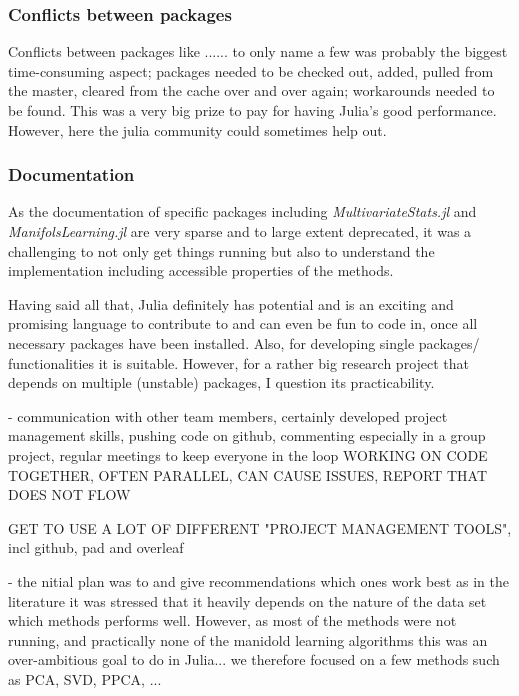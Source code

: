 \documentclass[journal, a4paper]{IEEEtran}
\begin{document}
\subsubsection{Conflicts between packages}
Conflicts between packages like ...... to only name a few was probably the biggest time-consuming aspect; packages needed to be checked out, added, pulled from the master, cleared from the cache over and over again; workarounds needed to be found. This was a very big prize to pay for having Julia's good performance. 
However, here the julia community could sometimes help out.

\subsubsection{Documentation}
As the documentation of specific packages including \textit{MultivariateStats.jl} and \textit{ManifolsLearning.jl} are very sparse and to large extent deprecated, it was a challenging to not only get things running but also to understand the implementation including accessible properties of the methods.


Having said all that, Julia definitely has potential and is an exciting and promising language to contribute to and can even be fun to code in, once all necessary packages have been installed. Also, for developing single packages/ functionalities it is suitable. However, for a rather big research project that depends on multiple (unstable) packages, I question its practicability.




- communication with other team members, certainly developed project management skills, 
pushing code on github, commenting especially in a group project,
regular meetings to keep everyone in the loop
WORKING ON CODE TOGETHER, OFTEN PARALLEL, CAN CAUSE ISSUES,
REPORT THAT DOES NOT FLOW

GET TO USE A LOT OF DIFFERENT "PROJECT MANAGEMENT TOOLS", incl github, pad and overleaf

- the nitial plan was to and give recommendations which ones work best as in the literature it was stressed that it heavily depends on the nature of the data set which methods performs well. However, as most of the methods were not running, and practically none of the manidold learning algorithms this was an over-ambitious goal to do in Julia...
we therefore focused on a few methods such as PCA, SVD, PPCA, ...
\end{document}
